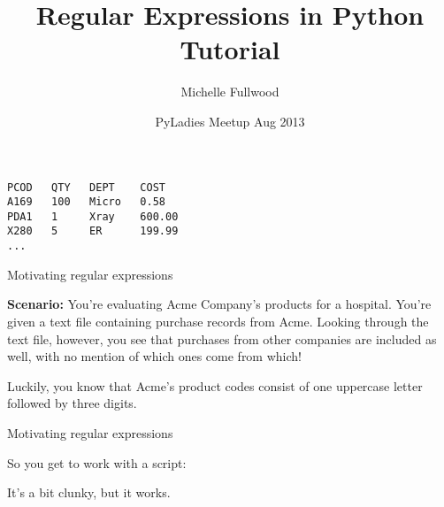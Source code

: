 \documentclass{beamer}
\title[Regexes in Python]{Regular Expressions in Python Tutorial}
\author{Michelle Fullwood}
\date{PyLadies Meetup Aug 2013}
\begin{document}
\begin{frame}
\titlepage
\end{frame}


\begin{lrbox}{\mysavebox}
\begin{lstlisting}
PCOD   QTY   DEPT    COST
A169   100   Micro   0.58
PDA1   1     Xray    600.00
X280   5     ER      199.99
...
\end{lstlisting}
\end{lrbox}

\begin{frame}{Motivating regular expressions}

{\bf Scenario:} You're evaluating Acme Company's products for a hospital.
You're given a text file containing purchase records from Acme.
Looking through the text file, however, you see that purchases from other companies
are included as well, with no mention of which ones come from which!

\begin{center}
\end{center}

Luckily, you know that Acme's product codes consist of one
uppercase letter followed by three digits.

\end{frame}


\begin{frame}{Motivating regular expressions}

So you get to work with a script:



It's a bit clunky, but it works.

\end{frame}
\end{document}
